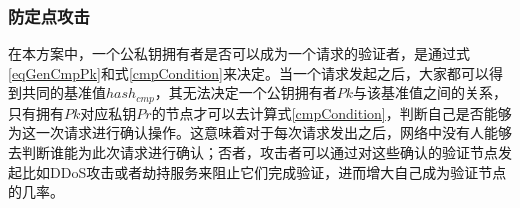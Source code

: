 \subsubsection{防定点攻击}

在本方案中，一个公私钥拥有者是否可以成为一个请求的验证者，是通过式\ref{eqGenCmpPk}和式\ref{cmpCondition}来决定。当一个请求发起之后，大家都可以得到共同的基准值$hash_{cmp}$，其无法决定一个公钥拥有者$Pk$与该基准值之间的关系，只有拥有$Pk$对应私钥$Pr$的节点才可以去计算式\ref{cmpCondition}，判断自己是否能够为这一次请求进行确认操作。这意味着对于每次请求发出之后，网络中没有人能够去判断谁能为此次请求进行确认；否者，攻击者可以通过对这些确认的验证节点发起比如DDoS攻击或者劫持服务来阻止它们完成验证，进而增大自己成为验证节点的几率。











